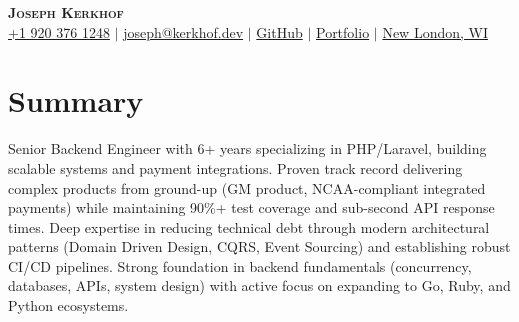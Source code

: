 \documentclass[letterpaper,11pt]{article}
\begin{document}

    \begin{center}
        \textbf{\Huge \scshape Joseph Kerkhof} \\ \vspace{3pt}
        \small
        \faMobile{} \hspace{.5pt} \href{tel:19203761248}{+1 920 376 1248}
        $|$
        \faAt{} \hspace{.5pt} \href{mailto:joseph@kerkhof.dev}{joseph@kerkhof.dev}
        $|$
        \faGithub{} \hspace{.5pt} \href{https://github.com/josephkerkhof}{GitHub}
        $|$
        \faGlobe{} \hspace{.5pt} \href{https://kerkhof.dev}{Portfolio}
        $|$
        \faMapMarker{} \hspace{.5pt} \href{https://maps.app.goo.gl/owhR2Cu3Db1u95g27}{New London, WI}
    \end{center}




    \section{Summary}
    \vspace{3pt}
    Senior Backend Engineer with 6+ years specializing in PHP/Laravel, building scalable systems and payment integrations. Proven track record delivering complex products from ground-up (GM product, NCAA-compliant integrated payments) while maintaining 90\%+ test coverage and sub-second API response times. Deep expertise in reducing technical debt through modern architectural patterns (Domain Driven Design, CQRS, Event Sourcing) and establishing robust CI/CD pipelines. Strong foundation in backend fundamentals (concurrency, databases, APIs, system design) with active focus on expanding to Go, Ruby, and Python ecosystems.


\end{document}
